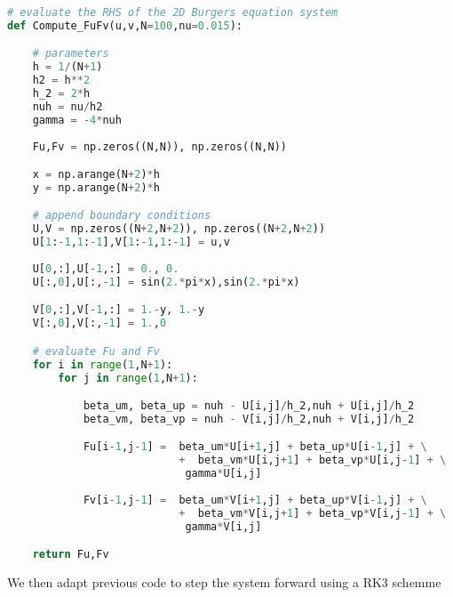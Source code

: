 \documentclass[11pt]{article}
\begin{document}
\begin{lstlisting}[language=Python]
# evaluate the RHS of the 2D Burgers equation system
def Compute_FuFv(u,v,N=100,nu=0.015):

    # parameters
    h = 1/(N+1)
    h2 = h**2
    h_2 = 2*h
    nuh = nu/h2
    gamma = -4*nuh
    
    Fu,Fv = np.zeros((N,N)), np.zeros((N,N))

    x = np.arange(N+2)*h
    y = np.arange(N+2)*h

    # append boundary conditions
    U,V = np.zeros((N+2,N+2)), np.zeros((N+2,N+2))
    U[1:-1,1:-1],V[1:-1,1:-1] = u,v
    
    U[0,:],U[-1,:] = 0., 0.
    U[:,0],U[:,-1] = sin(2.*pi*x),sin(2.*pi*x)

    V[0,:],V[-1,:] = 1.-y, 1.-y
    V[:,0],V[:,-1] = 1.,0

    # evaluate Fu and Fv
    for i in range(1,N+1):
        for j in range(1,N+1):

            beta_um, beta_up = nuh - U[i,j]/h_2,nuh + U[i,j]/h_2
            beta_vm, beta_vp = nuh - V[i,j]/h_2,nuh + V[i,j]/h_2

            Fu[i-1,j-1] =  beta_um*U[i+1,j] + beta_up*U[i-1,j] + \
                           +  beta_vm*U[i,j+1] + beta_vp*U[i,j-1] + \
                            gamma*U[i,j] 
                    
            Fv[i-1,j-1] =  beta_um*V[i+1,j] + beta_up*V[i-1,j] + \
                           +  beta_vm*V[i,j+1] + beta_vp*V[i,j-1] + \
                            gamma*V[i,j]

    return Fu,Fv
\end{lstlisting}

We then adapt previous code to step the system forward using a RK3 schemme
\end{document}
